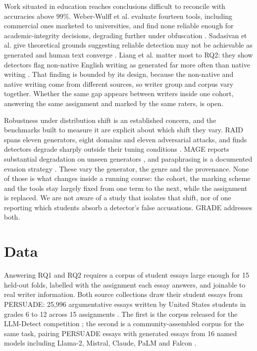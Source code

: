 \documentclass{article}
\begin{document}
Work situated in education reaches conclusions difficult to reconcile with
accuracies above 99\%. Weber-Wulff et al. evaluate fourteen tools,
including commercial ones marketed to universities, and find none reliable
enough for academic-integrity decisions, degrading further under
obfuscation \cite{weberwulff2023}. Sadasivan et al. give theoretical
grounds suggesting reliable detection may not be achievable as generated
and human text converge \cite{sadasivan2023}. Liang et al. matter most to
RQ2: they show detectors flag non-native English writing as generated far
more often than native writing \cite{liang2023}. That finding is bounded by
its design, because the non-native and native writing come from different
sources, so writer group and corpus vary together. Whether the same gap
appears between writers inside one cohort, answering the same assignment
and marked by the same raters, is open.

Robustness under distribution shift is an established concern, and the
benchmarks built to measure it are explicit about which shift they vary.
RAID spans eleven generators, eight domains and eleven adversarial attacks,
and finds detectors degrade sharply outside their tuning conditions
\cite{raid2024}. MAGE reports substantial degradation on unseen generators
\cite{mage2024}, and paraphrasing is a documented evasion strategy
\cite{krishna2023}. These vary the generator, the genre and the provenance.
None of those is what changes inside a running course: the cohort, the
marking scheme and the tools stay largely fixed from one term to the next,
while the assignment is replaced. We are not aware of a study that isolates
that shift, nor of one reporting which students absorb a detector's false
accusations. GRADE addresses both.

\section{Data}

Answering RQ1 and RQ2 requires a corpus of student essays large enough for
15 held-out folds, labelled with the assignment each essay answers, and
joinable to real writer information. Both source collections draw their
student essays from PERSUADE: 25,996 argumentative essays written by United
States students in grades 6 to 12 across 15 assignments \cite{crossley2024}.
The first is the corpus released for the LLM-Detect competition
\cite{king2023}; the second is a community-assembled corpus for the same
task, pairing PERSUADE essays with generated essays from 16 named models
including Llama-2, Mistral, Claude, PaLM and Falcon \cite{daigt2024}.
\end{document}
